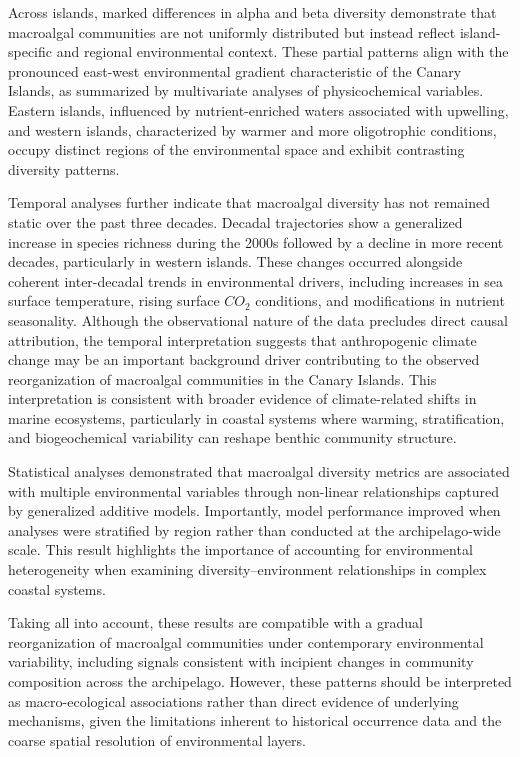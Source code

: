 \documentclass[a4paper,fleqn]{cas-sc}
\begin{document}
Across islands, marked differences in alpha and beta diversity demonstrate that macroalgal communities are not uniformly distributed but instead reflect island-specific and regional environmental context. These partial patterns align with the pronounced east-west environmental gradient characteristic of the Canary Islands, as summarized by multivariate analyses of physicochemical variables. Eastern islands, influenced by nutrient-enriched waters associated with upwelling, and western islands, characterized by warmer and more oligotrophic conditions, occupy distinct regions of the environmental space and exhibit contrasting diversity patterns.

Temporal analyses further indicate that macroalgal diversity has not remained static over the past three decades. Decadal trajectories show a generalized increase in species richness during the 2000s followed by a decline in more recent decades, particularly in western islands. These changes occurred alongside coherent inter-decadal trends in environmental drivers, including increases in sea surface temperature, rising surface $CO_{2}$ conditions, and modifications in nutrient seasonality. Although the observational nature of the data precludes direct causal attribution, the temporal interpretation suggests that anthropogenic climate change may be an important background driver contributing to the observed reorganization of macroalgal communities in the Canary Islands. This interpretation is consistent with broader evidence of climate-related shifts in marine ecosystems, particularly in coastal systems where warming, stratification, and biogeochemical variability can reshape benthic community structure.

Statistical analyses demonstrated that macroalgal diversity metrics are associated with multiple environmental variables through non-linear relationships captured by generalized additive models. Importantly, model performance improved when analyses were stratified by region rather than conducted at the archipelago-wide scale. This result highlights the importance of accounting for environmental heterogeneity when examining diversity–environment relationships in complex coastal systems.

Taking all into account, these results are compatible with a gradual reorganization of macroalgal communities under contemporary environmental variability, including signals consistent with incipient changes in community composition across the archipelago. However, these patterns should be interpreted as macro-ecological associations rather than direct evidence of underlying mechanisms, given the limitations inherent to historical occurrence data and the coarse spatial resolution of environmental layers.
\end{document}
